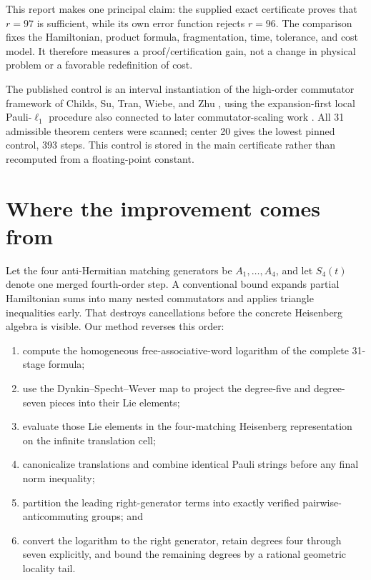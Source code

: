 \documentclass[11pt]{article}
\begin{document}
This report makes one principal claim: the supplied exact certificate proves
that $r=97$ is sufficient, while its own error function rejects $r=96$.  The
comparison fixes the Hamiltonian, product formula, fragmentation, time,
tolerance, and cost model.  It therefore measures a proof/certification gain,
not a change in physical problem or a favorable redefinition of cost.

The published control is an interval instantiation of the high-order
commutator framework of Childs, Su, Tran, Wiebe, and Zhu
\cite{childs2021theory}, using the expansion-first local Pauli-$\ell_1$
procedure also connected to later commutator-scaling work
\cite{schubert2023trotter}.  All 31 admissible theorem centers were scanned;
center 20 gives the lowest pinned control, 393 steps.  This control is stored
in the main certificate rather than recomputed from a floating-point constant.

\section{Where the improvement comes from}

Let the four anti-Hermitian matching generators be $A_1,\ldots,A_4$, and let
$S_4(t)$ denote one merged fourth-order step.  A conventional bound expands
partial Hamiltonian sums into many nested commutators and applies triangle
inequalities early.  That destroys cancellations before the concrete
Heisenberg algebra is visible.  Our method reverses this order:

\begin{enumerate}
  \item compute the homogeneous free-associative-word logarithm of the complete
        31-stage formula;
  \item use the Dynkin--Specht--Wever map to project the degree-five and
        degree-seven pieces into their Lie elements;
  \item evaluate those Lie elements in the four-matching Heisenberg
        representation on the infinite translation cell;
  \item canonicalize translations and combine identical Pauli strings before
        any final norm inequality;
  \item partition the leading right-generator terms into exactly verified
        pairwise-anticommuting groups; and
  \item convert the logarithm to the right generator, retain degrees four
        through seven explicitly, and bound the remaining degrees by a
        rational geometric locality tail.
\end{enumerate}
\end{document}
